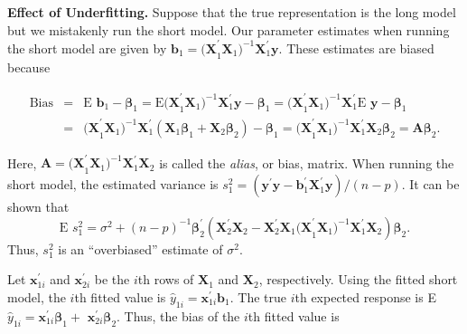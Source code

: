 \textbf{Effect of Underfitting.} Suppose that the true representation is the
long model but we mistakenly run the short model. Our parameter estimates
when running the short model are given by $\mathbf{b}_{1}=\mathbf{(X}%
_{1}^{\prime }\mathbf{X}_{1}\mathbf{)}^{-1}\mathbf{X}_{1}^{\prime
}\mathbf{y} $. These estimates are biased because
\begin{center}
\begin{eqnarray*}
\text{Bias} &=&\text{E }\mathbf{b}_{1}-\boldsymbol \beta_{1}
=\text{E}\mathbf{(X%
}_{1}^{\prime }\mathbf{X}_{1}\mathbf{)}^{-1}\mathbf{X}_{1}^{\prime }\mathbf{y%
}-\boldsymbol \beta_{1}
=\mathbf{(X}_{1}^{\prime }\mathbf{X}_{1}\mathbf{)}^{-1}%
\mathbf{X}_{1}^{\prime }\text{E }\mathbf{y}-\boldsymbol \beta_{1} \\
&=&\mathbf{(X}_{1}^{\prime }\mathbf{X}_{1}\mathbf{)}^{-1}\mathbf{X}%
_{1}^{\prime }\left( \mathbf{X}_{1}\boldsymbol \beta_{1}+\mathbf{X}_{2}\boldsymbol \beta_{2}\right)
- \boldsymbol \beta_{1}=\mathbf{(X}_{1}^{\prime }\mathbf{X}%
_{1}\mathbf{)}^{-1}\mathbf{X}_{1}^{\prime }\mathbf{X}_{2}\boldsymbol \beta_{2}=%
\mathbf{A \boldsymbol \beta }_{2}.
\end{eqnarray*}
\end{center}
Here, $\mathbf{A}=\mathbf{(X}_{1}^{\prime }\mathbf{X}_{1}\mathbf{)}^{-1}%
\mathbf{X}_{1}^{\prime }\mathbf{X}_{2}$ is called the \textit{alias}, or
bias, matrix. When running the short model, the estimated variance is $%
s_{1}^{2}=(\mathbf{y}^{\prime }\mathbf{y}-\mathbf{b}_{1}^{\prime }\mathbf{X}%
_{1}^{\prime }\mathbf{y})/(n-p)$. It can be shown that
\begin{equation}\label{E5:AliasBias}
\text{E }s_{1}^{2}=\sigma ^{2}+(n-p)^{-1}\boldsymbol
\beta_{2}^{\prime }\left(
\mathbf{X}_{2}^{\prime }\mathbf{X}_{2}-\mathbf{X}_{2}^{\prime }\mathbf{X}_{1}%
\mathbf{(X}_{1}^{\prime
}\mathbf{X}_{1}\mathbf{)}^{-1}\mathbf{X}_{1}^{\prime
}\mathbf{X}_{2}\right) \boldsymbol \beta_{2}.
\end{equation}
Thus, $s_{1}^{2}$ is an ``overbiased'' estimate of $\sigma ^{2}$.

Let $\mathbf{x}_{1i}^{\prime }$ and $\mathbf{x}_{2i}^{\prime }$ be
the $i$th rows of $\mathbf{X}_{1}$ and $\mathbf{X}_{2}$,
respectively. Using
the fitted short model, the $i$th fitted value is $\hat{y}_{1i}=\mathbf{x}%
_{1i}^{\prime }\mathbf{b}_{1}$. The true $i$th expected response is E $\hat{y%
}_{1i}=\mathbf{x}_{1i}^{\prime } \boldsymbol \beta_{1}+$
$\mathbf{x}_{2i}^{\prime } \boldsymbol \beta_{2}$. Thus, the bias of
the $i$th fitted value is


